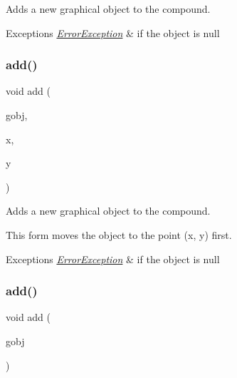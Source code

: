 Adds a new graphical object to the compound. 


\begin{DoxyExceptions}{Exceptions}
{\em \mbox{\hyperlink{classErrorException}{Error\+Exception}}} & if the object is null \\
\hline
\end{DoxyExceptions}
\mbox{\label{classGCompound_a8bb36f245efc7806414a1339c2befa1c}} 
\subsubsection{\texorpdfstring{add()}{add()}\hspace{0.1cm}{\footnotesize\ttfamily [2/4]}}
{\footnotesize\ttfamily void add (\begin{DoxyParamCaption}\item[{\mbox{\hyperlink{classGObject}{G\+Object}} $\ast$}]{gobj,  }\item[{double}]{x,  }\item[{double}]{y }\end{DoxyParamCaption})\hspace{0.3cm}{\ttfamily [virtual]}}



Adds a new graphical object to the compound. 

This form moves the object to the point ({\ttfamily x}, {\ttfamily y}) first. 
\begin{DoxyExceptions}{Exceptions}
{\em \mbox{\hyperlink{classErrorException}{Error\+Exception}}} & if the object is null \\
\hline
\end{DoxyExceptions}
\mbox{\label{classGCompound_ac732fc2123d7a6d7e2de145fe9bbd8e8}} 
\subsubsection{\texorpdfstring{add()}{add()}\hspace{0.1cm}{\footnotesize\ttfamily [3/4]}}
{\footnotesize\ttfamily void add (\begin{DoxyParamCaption}\item[{\mbox{\hyperlink{classGObject}{G\+Object}} \&}]{gobj }\end{DoxyParamCaption})\hspace{0.3cm}{\ttfamily [virtual]}}




